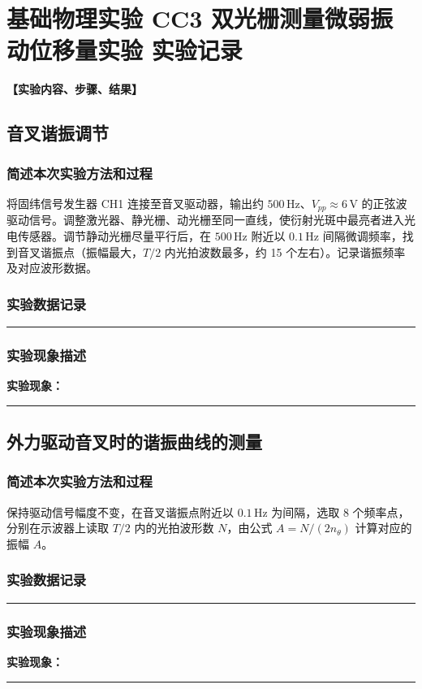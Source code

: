 \documentclass[dvipsnames, svgnames,a4paper,11pt]{article}
\newcommand{\recordblank}[1]{%
  \par\noindent\rule{0.95\linewidth}{0pt}\rule{0pt}{#1}\par}
\begin{document}
\section{基础物理实验  \quad  CC3 双光栅测量微弱振动位移量实验 \quad 实验记录}


\textbf{【实验内容、步骤、结果】}

\subsection{音叉谐振调节}
\subsubsection{简述本次实验方法和过程}

将固纬信号发生器 CH1 连接至音叉驱动器，输出约 $500\,\text{Hz}$、$V_{pp} \approx 6\,\text{V}$ 的正弦波驱动信号。调整激光器、静光栅、动光栅至同一直线，使衍射光斑中最亮者进入光电传感器。调节静动光栅尽量平行后，在 $500\,\text{Hz}$ 附近以 $0.1\,\text{Hz}$ 间隔微调频率，找到音叉谐振点（振幅最大，$T/2$ 内光拍波数最多，约 15 个左右）。记录谐振频率及对应波形数据。

\subsubsection{实验数据记录}
\recordblank{5.5cm}
\subsubsection{实验现象描述}
\noindent\textbf{实验现象：}\par
\recordblank{4.5cm}
\subsection{外力驱动音叉时的谐振曲线的测量}
\subsubsection{简述本次实验方法和过程}

保持驱动信号幅度不变，在音叉谐振点附近以 $0.1\,\text{Hz}$ 为间隔，选取 8 个频率点，分别在示波器上读取 $T/2$ 内的光拍波形数 $N$，由公式 $A = N/(2n_\theta)$ 计算对应的振幅 $A$。

\subsubsection{实验数据记录}
\recordblank{5.5cm}
\subsubsection{实验现象描述}
\noindent\textbf{实验现象：}\par
\recordblank{4.5cm}
\end{document}
